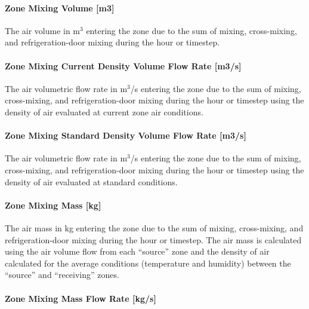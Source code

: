 \paragraph{Zone Mixing Volume {[}m3{]}}\label{zone-mixing-volume-m3-2}

The air volume in m\(^{3}\) entering the zone due to the sum of mixing, cross-mixing, and refrigeration-door mixing during the hour or timestep.

\paragraph{Zone Mixing Current Density Volume Flow Rate {[}m3/s{]}}\label{zone-mixing-current-density-volumetric-flow-rate-m3s-2}

The air volumetric flow rate in m\(^{3}\)/s entering the zone due to the sum of mixing, cross-mixing, and refrigeration-door mixing during the hour or timestep using the density of air evaluated at current zone air conditions.

\paragraph{Zone Mixing Standard Density Volume Flow Rate {[}m3/s{]}}\label{zone-mixing-standard-density-volumetric-flow-rate-m3s-2}

The air volumetric flow rate in m\(^{3}\)/s entering the zone due to the sum of mixing, cross-mixing, and refrigeration-door mixing during the hour or timestep using the density of air evaluated at standard conditions.

\paragraph{Zone Mixing Mass {[}kg{]}}\label{zone-mixing-mass-kg-2}

The air mass in kg entering the zone due to the sum of mixing, cross-mixing, and refrigeration-door mixing during the hour or timestep. The air mass is calculated using the air volume flow from each ``source'' zone and the density of air calculated for the average conditions (temperature and humidity) between the ``source'' and ``receiving'' zones.

\paragraph{Zone Mixing Mass Flow Rate {[}kg/s{]}}\label{zone-mixing-mass-flow-rate-kgs-2}

